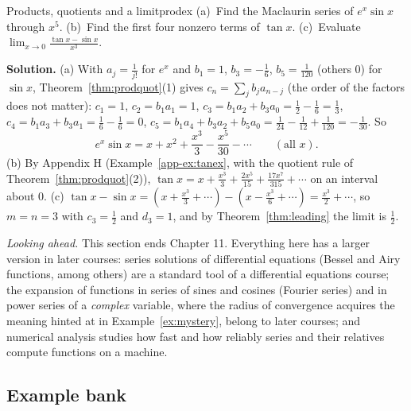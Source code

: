 \documentclass[11pt]{article}
\begin{document}
\begin{exmp}{Products, quotients and a limit}{prodex}
(a)~Find the Maclaurin series of $e^x\sin x$ through $x^5$. (b)~Find the first four nonzero terms of $\tan x$. (c)~Evaluate $\displaystyle\lim_{x\to0}\frac{\tan x-\sin x}{x^3}$.

\textbf{Solution.} (a) With $a_j=\frac1{j!}$ for $e^x$ and $b_1=1$, $b_3=-\frac16$, $b_5=\frac1{120}$ (others $0$) for $\sin x$, Theorem~\ref{thm:prodquot}(1) gives $c_n=\sum_jb_j a_{n-j}$ (the order of the factors does not matter): $c_1=1$, $c_2=b_1a_1=1$, $c_3=b_1a_2+b_3a_0=\frac12-\frac16=\frac13$, $c_4=b_1a_3+b_3a_1=\frac16-\frac16=0$, $c_5=b_1a_4+b_3a_2+b_5a_0=\frac1{24}-\frac1{12}+\frac1{120}=-\frac1{30}$. So
\[
e^x\sin x=x+x^2+\frac{x^3}3-\frac{x^5}{30}-\cdots\qquad(\text{all }x).
\]
(b) By Appendix H (Example~\ref{app-ex:tanex}, with the quotient rule of Theorem~\ref{thm:prodquot}(2)), $\tan x=x+\frac{x^3}3+\frac{2x^5}{15}+\frac{17x^7}{315}+\cdots$ on an interval about $0$. (c) $\tan x-\sin x=\left(x+\frac{x^3}3+\cdots\right)-\left(x-\frac{x^3}6+\cdots\right)=\frac{x^3}2+\cdots$, so $m=n=3$ with $c_3=\frac12$ and $d_3=1$, and by Theorem~\ref{thm:leading} the limit is $\frac12$.
\end{exmp}

\emph{Looking ahead.} This section ends Chapter 11. Everything here has a larger version in later courses: series solutions of differential equations (Bessel and Airy functions, among others) are a standard tool of a differential equations course; the expansion of functions in series of sines and cosines (Fourier series) and in power series of a \emph{complex} variable, where the radius of convergence acquires the meaning hinted at in Example~\ref{ex:mystery}, belong to later courses; and numerical analysis studies how fast and how reliably series and their relatives compute functions on a machine.


\subsection*{Example bank}
\end{document}
